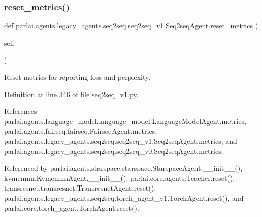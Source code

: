 \subsubsection{\texorpdfstring{reset\+\_\+metrics()}{reset\_metrics()}}
{\footnotesize\ttfamily def parlai.\+agents.\+legacy\+\_\+agents.\+seq2seq.\+seq2seq\+\_\+v1.\+Seq2seq\+Agent.\+reset\+\_\+metrics (\begin{DoxyParamCaption}\item[{}]{self }\end{DoxyParamCaption})}

\begin{DoxyVerb}Reset metrics for reporting loss and perplexity.\end{DoxyVerb}
 

Definition at line 346 of file seq2seq\+\_\+v1.\+py.



References parlai.\+agents.\+language\+\_\+model.\+language\+\_\+model.\+Language\+Model\+Agent.\+metrics, parlai.\+agents.\+fairseq.\+fairseq.\+Fairseq\+Agent.\+metrics, parlai.\+agents.\+legacy\+\_\+agents.\+seq2seq.\+seq2seq\+\_\+v1.\+Seq2seq\+Agent.\+metrics, and parlai.\+agents.\+legacy\+\_\+agents.\+seq2seq.\+seq2seq\+\_\+v0.\+Seq2seq\+Agent.\+metrics.



Referenced by parlai.\+agents.\+starspace.\+starspace.\+Starspace\+Agent.\+\_\+\+\_\+init\+\_\+\+\_\+(), kvmemnn.\+Kvmemnn\+Agent.\+\_\+\+\_\+init\+\_\+\+\_\+(), parlai.\+core.\+agents.\+Teacher.\+reset(), transresnet.\+transresnet.\+Transresnet\+Agent.\+reset(), parlai.\+agents.\+legacy\+\_\+agents.\+seq2seq.\+torch\+\_\+agent\+\_\+v1.\+Torch\+Agent.\+reset(), and parlai.\+core.\+torch\+\_\+agent.\+Torch\+Agent.\+reset().

